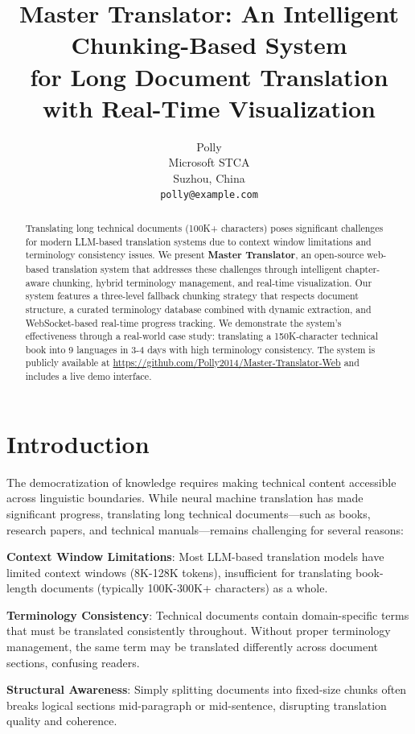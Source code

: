 \documentclass[11pt]{article}
\title{Master Translator: An Intelligent Chunking-Based System \\for Long Document Translation with Real-Time Visualization}
\author{
  Polly \\
  Microsoft STCA \\
  Suzhou, China \\
  \texttt{polly@example.com} \\
}
\begin{document}
\maketitle

\begin{abstract}
Translating long technical documents (100K+ characters) poses significant challenges for modern LLM-based translation systems due to context window limitations and terminology consistency issues. We present \textbf{Master Translator}, an open-source web-based translation system that addresses these challenges through intelligent chapter-aware chunking, hybrid terminology management, and real-time visualization. Our system features a three-level fallback chunking strategy that respects document structure, a curated terminology database combined with dynamic extraction, and WebSocket-based real-time progress tracking. We demonstrate the system's effectiveness through a real-world case study: translating a 150K-character technical book into 9 languages in 3-4 days with high terminology consistency. The system is publicly available at \url{https://github.com/Polly2014/Master-Translator-Web} and includes a live demo interface.
\end{abstract}

\section{Introduction}

The democratization of knowledge requires making technical content accessible across linguistic boundaries. While neural machine translation has made significant progress, translating long technical documents---such as books, research papers, and technical manuals---remains challenging for several reasons:

\textbf{Context Window Limitations}: Most LLM-based translation models have limited context windows (8K-128K tokens), insufficient for translating book-length documents (typically 100K-300K+ characters) as a whole.

\textbf{Terminology Consistency}: Technical documents contain domain-specific terms that must be translated consistently throughout. Without proper terminology management, the same term may be translated differently across document sections, confusing readers.

\textbf{Structural Awareness}: Simply splitting documents into fixed-size chunks often breaks logical sections mid-paragraph or mid-sentence, disrupting translation quality and coherence.
\end{document}
